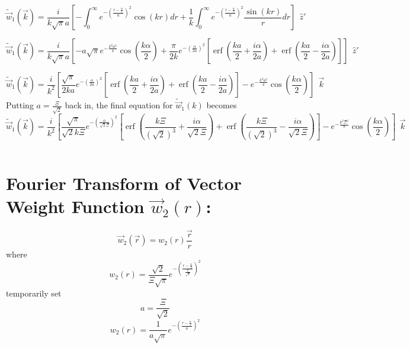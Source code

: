 \documentclass[double,12pt]{beavtex}
\begin{document}
\begin{equation}{\widetilde{\vec{w}}_1(\vec{k})=\frac{i}{k\sqrt{\pi}a}\left[-\int_{0}^{\infty}e^{-\left(\frac{r-\frac{\alpha}{2}}{a}\right)^2}\cos(kr)d{r}+\frac{1}{k}\int_{0}^{\infty}e^{-\left(\frac{r-\frac{\alpha}{2}}{a}\right)^2}\frac{\sin(kr)}{r}d{r}\right]{~~}\hat{z}'}\end{equation}

\begin{equation}{\widetilde{\vec{w}}_1(\vec{k})=\frac{i}{k\sqrt{\pi}a}\left[-a\sqrt{\pi}e^{-\frac{k^2a^2}{4}}\cos\left(\frac{k\alpha}{2}\right)+\frac{\pi}{2k}e^{-\left(\frac{\alpha}{2a}\right)^2}\left[\operatorname{erf}\left(\frac{ka}{2}+\frac{i\alpha}{2a}\right)+\operatorname{erf}\left(\frac{ka}{2}-\frac{i\alpha}{2a}\right)\right]\right]{~~}\hat{z}'}\end{equation}

\begin{equation}{\widetilde{\vec{w}}_1(\vec{k})=\frac{i}{k^2}\left[\frac{\sqrt{\pi}}{2ka}e^{-\left(\frac{\alpha}{2a}\right)^2}\left[\operatorname{erf}\left(\frac{ka}{2}+\frac{i\alpha}{2a}\right)+\operatorname{erf}\left(\frac{ka}{2}-\frac{i\alpha}{2a}\right)\right]-e^{-\frac{k^2a^2}{4}}\cos\left(\frac{k\alpha}{2}\right)\right]{~~}\vec{k}}\end{equation}
Putting $a=\frac{\Xi}{\sqrt{2}}$ back in, the final equation for $\widetilde{\vec{w}}_1(k)$ becomes
\begin{equation}{\widetilde{\vec{w}}_1(\vec{k})=\frac{i}{k^2}\left[\frac{\sqrt{\pi}}{\sqrt{2}k\Xi}e^{-\left(\frac{\alpha}{\sqrt{2}\Xi}\right)^2}\left[\operatorname{erf}\left(\frac{k\Xi}{(\sqrt{2})^3}+\frac{i\alpha}{\sqrt{2}\Xi}\right)+\operatorname{erf}\left(\frac{k\Xi}{(\sqrt{2})^3}-\frac{i\alpha}{\sqrt{2}\Xi}\right)\right]-e^{-\frac{k^2\Xi^2}{8}}\cos\left(\frac{k\alpha}{2}\right)\right]{~~}\vec{k}}\end{equation}

\[{}\]
\section{Fourier Transform of Vector Weight Function $\vec{w}_{2}(r)$:}
\begin{equation}{\vec{w}_2(\vec{r})=w_2(r)\frac{\vec{r}}{r}}\end{equation}
where
\begin{equation}{w_2(r)=\frac{\sqrt{2}}{\Xi\sqrt{\pi}}e^{-\left(\frac{r-\frac{\alpha}{2}}{\frac{\Xi}{\sqrt{2}}}\right)^2}}\end{equation}
temporarily set 
\begin{equation}{a=\frac{\Xi}{\sqrt{2}}}\end{equation}
\begin{equation}{w_2(r)=\frac{1}{a\sqrt{\pi}}e^{-\left(\frac{r-\frac{\alpha}{2}}{a}\right)^2}}\end{equation}
\end{document}
